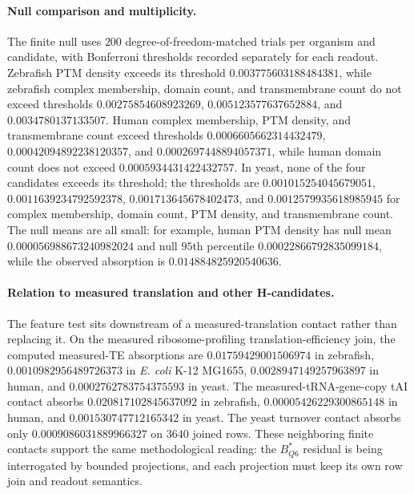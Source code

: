 \paragraph{Null comparison and multiplicity.}
The finite null uses $200$ degree-of-freedom-matched trials per organism and candidate, with Bonferroni thresholds recorded separately for each readout. Zebrafish PTM density exceeds its threshold $0.003775603188484381$, while zebrafish complex membership, domain count, and transmembrane count do not exceed thresholds $0.00275854608923269$, $0.005123577637652884$, and $0.0034780137133507$. Human complex membership, PTM density, and transmembrane count exceed thresholds $0.0006605662314432479$, $0.00042094892238120357$, and $0.0002697448894057371$, while human domain count does not exceed $0.0005934431422432757$. In yeast, none of the four candidates exceeds its threshold; the thresholds are $0.001015254045679051$, $0.0011639234792592378$, $0.001713645678402473$, and $0.0012579935618985945$ for complex membership, domain count, PTM density, and transmembrane count. The null means are all small: for example, human PTM density has null mean $0.000056988673240982024$ and null $95$th percentile $0.00022866792835099184$, while the observed absorption is $0.014884825920540636$.

\paragraph{Relation to measured translation and other H-candidates.}
The feature test sits downstream of a measured-translation contact rather than replacing it. On the measured ribosome-profiling translation-efficiency join, the computed measured-TE absorptions are $0.01759429001506974$ in zebrafish, $0.0010982956489726373$ in \emph{E. coli} K-12 MG1655, $0.0028947149257963897$ in human, and $0.0002762783754375593$ in yeast. The measured-tRNA-gene-copy tAI contact absorbs $0.020817102845637092$ in zebrafish, $0.00005426229300865148$ in human, and $0.001530747712165342$ in yeast. The yeast turnover contact absorbs only $0.0009086031889966327$ on $3640$ joined rows. These neighboring finite contacts support the same methodological reading: the $B^*_{Q6}$ residual is being interrogated by bounded projections, and each projection must keep its own row join and readout semantics.

